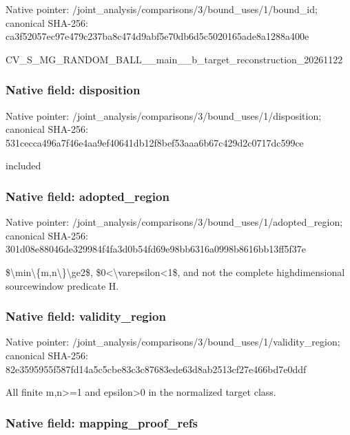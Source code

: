 \documentclass[10pt,a4paper]{article}
\begin{document}
Native pointer: /joint\_analysis/comparis\allowbreak{}ons/3/bound\_uses/1/bound\allowbreak{}\_id; canonical SHA-256: ca3f52057ec97e479c237ba8\allowbreak{}c474d9abf5e70db6d5c50201\allowbreak{}65ade8a1288a400e


CV\_S\_MG\_RANDOM\_BALL\_\_mai\allowbreak{}n\_\_b\_target\_reconstructi\allowbreak{}on\_20261122


\subsubsection{Native field: disposition}


Native pointer: /joint\_analysis/comparis\allowbreak{}ons/3/bound\_uses/1/dispo\allowbreak{}sition; canonical SHA-256: 531cecca496a7f46e4aa9ef4\allowbreak{}0641db12f8bef53aaa6b67c4\allowbreak{}29d2c0717dc599ce


included


\subsubsection{Native field: adopted\_region}


Native pointer: /joint\_analysis/comparis\allowbreak{}ons/3/bound\_uses/1/adopt\allowbreak{}ed\_region; canonical SHA-256: 301d08e88046de329984f4fa\allowbreak{}3d0b54fd69e98bb6316a0998\allowbreak{}b8616bb13ff5f37e


\$\textbackslash{}min\textbackslash{}\{m,n\textbackslash{}\}\textbackslash{}ge2\$, \$0<\textbackslash{}varepsilon<1\$, and not the complete highdimensional sourcewindow predicate H.


\subsubsection{Native field: validity\_region}


Native pointer: /joint\_analysis/comparis\allowbreak{}ons/3/bound\_uses/1/valid\allowbreak{}ity\_region; canonical SHA-256: 82e3595955f587fd14a5c5cb\allowbreak{}e83c3c87683ede63d8ab2513\allowbreak{}cf27e466bd7e0ddf


All finite m,n>=1 and epsilon>0 in the normalized target class.


\subsubsection{Native field: mapping\_proof\_refs}
\end{document}
